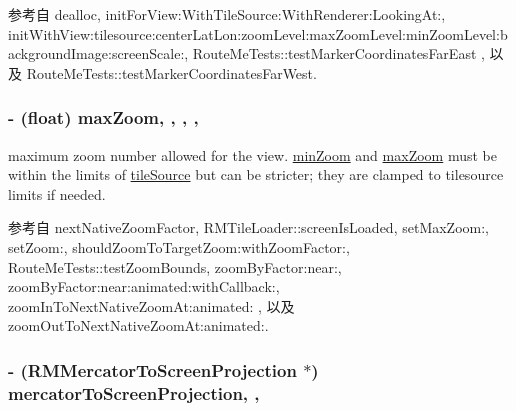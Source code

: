 参考自 dealloc, init\-For\-View\-:\-With\-Tile\-Source\-:\-With\-Renderer\-:\-Looking\-At\-:, init\-With\-View\-:tilesource\-:center\-Lat\-Lon\-:zoom\-Level\-:max\-Zoom\-Level\-:min\-Zoom\-Level\-:background\-Image\-:screen\-Scale\-:, Route\-Me\-Tests\-::test\-Marker\-Coordinates\-Far\-East , 以及 Route\-Me\-Tests\-::test\-Marker\-Coordinates\-Far\-West.

\hypertarget{interface_r_m_map_contents_afa0fef34433cbc987d0346dccbd151a1}{
\subsubsection[{max\-Zoom}]{\setlength{\rightskip}{0pt plus 5cm}-\/ (float) max\-Zoom\hspace{0.3cm}{\ttfamily [read]}, {\ttfamily [write]}, {\ttfamily [nonatomic]}, {\ttfamily [assign]}, {\ttfamily [protected]}}}\label{interface_r_m_map_contents_afa0fef34433cbc987d0346dccbd151a1}


maximum zoom number allowed for the view. \hyperlink{interface_r_m_map_contents_ab434ff9dc95d209ad2d53cf8d0f1703b}{min\-Zoom} and \hyperlink{interface_r_m_map_contents_afa0fef34433cbc987d0346dccbd151a1}{max\-Zoom} must be within the limits of \hyperlink{interface_r_m_map_contents_afdc2f45aee8bcc5633182450fdea0cfc}{tile\-Source} but can be stricter; they are clamped to tilesource limits if needed. 



参考自 next\-Native\-Zoom\-Factor, R\-M\-Tile\-Loader\-::screen\-Is\-Loaded, set\-Max\-Zoom\-:, set\-Zoom\-:, should\-Zoom\-To\-Target\-Zoom\-:with\-Zoom\-Factor\-:, Route\-Me\-Tests\-::test\-Zoom\-Bounds, zoom\-By\-Factor\-:near\-:, zoom\-By\-Factor\-:near\-:animated\-:with\-Callback\-:, zoom\-In\-To\-Next\-Native\-Zoom\-At\-:animated\-: , 以及 zoom\-Out\-To\-Next\-Native\-Zoom\-At\-:animated\-:.

\hypertarget{interface_r_m_map_contents_ac90bc80b3d40b418ff2fa21dc35cf6ca}{
\subsubsection[{mercator\-To\-Screen\-Projection}]{\setlength{\rightskip}{0pt plus 5cm}-\/ ({\bf R\-M\-Mercator\-To\-Screen\-Projection} $\ast$) mercator\-To\-Screen\-Projection\hspace{0.3cm}{\ttfamily [read]}, {\ttfamily [atomic]}, {\ttfamily [assign]}}}\label{interface_r_m_map_contents_ac90bc80b3d40b418ff2fa21dc35cf6ca}


